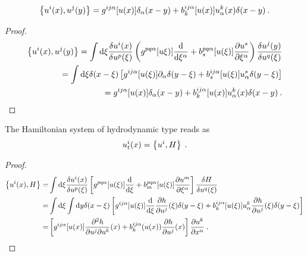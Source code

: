 


\begin{proposition}
    \begin{align}
        \left \lbrace u^i(x), u^j(y) \right \rbrace = g^{ij \alpha} [u(x)] \delta_\alpha(x-y) + b_k^{ij \alpha} [u(x)] u_\alpha^k(x) \delta(x-y) \:.
    \end{align}
\end{proposition}

\begin{proof}
    \begin{align}
        \left \lbrace u^i(x), u^j(y) \right \rbrace = \int \mathrm{d} \xi \frac{\delta u^i(x)}{\delta u^p(\xi)} \left( g^{pq \alpha}[u\xi)] \frac{\mathrm{d}}{\mathrm{d}\xi^\alpha} + b^{pq \alpha}_s[u(\xi)] \frac{\partial u^s}{\partial \xi^\alpha} \right) \frac{\delta u^j(y)}{\delta u^q(\xi)}
        \\ = \int \mathrm{d} \xi \delta(x-\xi) \left[ g^{ij \alpha}[u(\xi)] \partial_\alpha \delta(y-\xi) + b^{ij \alpha}_s[u(\xi)] u^s_\alpha \delta(y- \xi) \right] 
        \\ = g^{ij \alpha} [u(x)] \delta_\alpha(x-y) + b_k^{ij \alpha} [u(x)] u_\alpha^k(x) \delta(x-y) \:.
    \end{align}
\end{proof}

\begin{proposition}
    The Hamiltonian system of hydrodynamic type reads as
    \begin{align}
        u^i_t(x) = \left \lbrace u^i,H \right \rbrace \:.
    \end{align}
\end{proposition}
\begin{proof}
    \begin{align*}
        \left \lbrace u^i(x),H \right \rbrace 
        =& \int \mathrm{d} \xi \frac{\delta u^i(x)}{\delta u^p(\xi)} \left[ g^{pq \alpha}[u(\xi)] \frac{\mathrm{d}}{\mathrm{d}\xi} + b^{pq \alpha}_m [u(\xi)] \frac{\partial u^m}{\partial \xi^\alpha} \right] \frac{\delta H}{\delta u^q(\xi)} 
        \\ =& \int \mathrm{d} \xi \int \mathrm{d} y \delta(x-\xi) \left[  g^{ij \alpha} [u(\xi)] \frac{\mathrm{d}}{\mathrm{d}\xi} \frac{\partial h}{\partial u^j}(\xi) \delta(y-\xi) + b^{ij \alpha}_k [u(\xi)] u^k_\alpha \frac{\partial h}{\partial u^j} (\xi) \delta(y-\xi) \right]  
        \\ =& \left[ g^{ij \alpha} [u(x)] \frac{\partial ^2 h}{\partial u^j \partial u^k}(x)  + b^{ij \alpha}_k(u(x)) \frac{\partial h}{\partial u^j}(x) \right] \frac{\partial u^k}{\partial x^\alpha} \:.
    \end{align*}
\end{proof}

